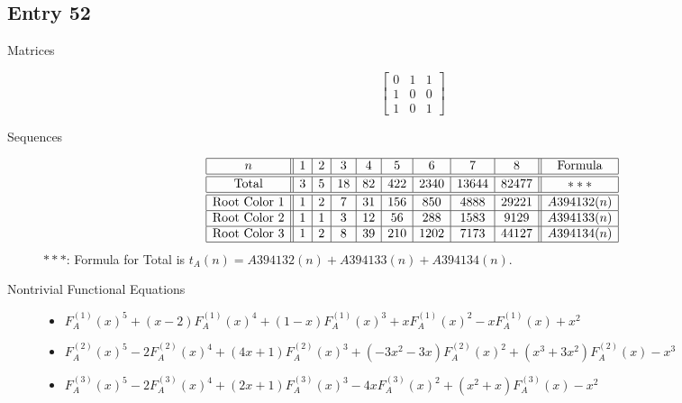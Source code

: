 \documentclass[12pt]{amsart}
\newcommand{\gff}[2]{F_{#2}^{(#1)}(x)}
\newcommand{\gfa}[1]{\gff{#1}{A}}
\begin{document}
\subsection*{Entry 52}
\begin{description}
    \item[Matrices]
    
    \[\begin{bmatrix}
0 & 1 & 1 \\
1 & 0 & 0 \\
1 & 0 & 1
\end{bmatrix}\]
    \item[Sequences]\hspace*{\fill}\vspace{-0.5cm}
    \begin{center}
        \[
        \begin{array}{|c||c|c|c|c|c|c|c|c||c|}\hline
           n  & 1 & 2 & 3 & 4 & 5 & 6 & 7 & 8  & \text{Formula}\\\hline\hline
           \text{Total}  & 3 & 5 & 18 & 82 & 422 & 2340 & 13644 & 82477 & ***\\\hline\hline
           \text{Root Color }1 & 1 & 2 & 7 & 31 & 156 & 850 & 4888 & 29221 & A394132(n)\\\hline
           \text{Root Color }2 & 1 & 1 & 3 & 12 & 56 & 288 & 1583 & 9129 & A394133(n)\\\hline
           \text{Root Color }3 & 1 & 2 & 8 & 39 & 210 & 1202 & 7173 & 44127 & A394134(n)\\\hline
        \end{array}
        \]
        $***$: Formula for Total is $t_A(n)=A394132(n)+A394133(n)+A394134(n)$.
    \end{center}
    
    \item[Nontrivial Functional Equations]\hspace*{\fill}

    \begin{itemize}
\item $\gfa{1}^5+(x - 2)\gfa{1}^4+(1 - x)\gfa{1}^3+x\gfa{1}^2-x\gfa{1}+x^2$


\item $\gfa{2}^5-2\gfa{2}^4+(4x + 1)\gfa{2}^3+(-3x^2 - 3x)\gfa{2}^2+(x^3 + 3x^2)\gfa{2}-x^3$

\item $\gfa{3}^5-2\gfa{3}^4+(2x + 1)\gfa{3}^3-4x\gfa{3}^2+(x^2 + x)\gfa{3}-x^2$


\end{itemize}
    
\end{description}
\end{document}
